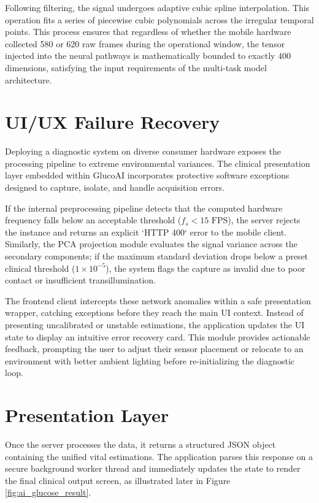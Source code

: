 Following filtering, the signal undergoes adaptive cubic spline interpolation. This operation fits a series of piecewise cubic polynomials across the irregular temporal points. This process ensures that regardless of whether the mobile hardware collected 580 or 620 raw frames during the operational window, the tensor injected into the neural pathways is mathematically bounded to exactly $400$ dimensions, satisfying the input requirements of the multi-task model architecture.

\section{UI/UX Failure Recovery}
Deploying a diagnostic system on diverse consumer hardware exposes the processing pipeline to extreme environmental variances. The clinical presentation layer embedded within GlucoAI incorporates protective software exceptions designed to capture, isolate, and handle acquisition errors.

If the internal preprocessing pipeline detects that the computed hardware frequency falls below an acceptable threshold ($f_s < 15\text{ FPS}$), the server rejects the instance and returns an explicit `HTTP 400` error to the mobile client. Similarly, the PCA projection module evaluates the signal variance across the secondary components; if the maximum standard deviation drops below a preset clinical threshold ($1\times10^{-5}$), the system flags the capture as invalid due to poor contact or insufficient transillumination.

The frontend client intercepts these network anomalies within a safe presentation wrapper, catching exceptions before they reach the main UI context. Instead of presenting uncalibrated or unstable estimations, the application updates the UI state to display an intuitive error recovery card. This module provides actionable feedback, prompting the user to adjust their sensor placement or relocate to an environment with better ambient lighting before re-initializing the diagnostic loop.

\section{Presentation Layer}
Once the server processes the data, it returns a structured JSON object containing the unified vital estimations. The application parses this response on a secure background worker thread and immediately updates the state to render the final clinical output screen, as illustrated later in Figure \ref{fig:ai_glucose_result}.

